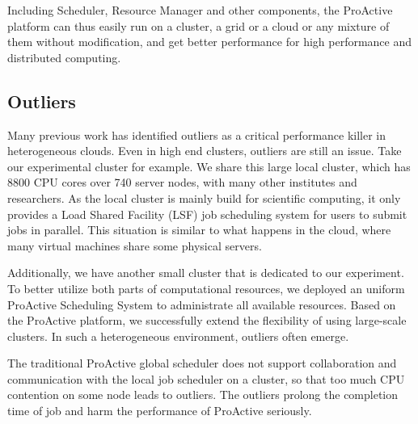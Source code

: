 Including Scheduler, Resource Manager and other components, the ProActive platform can thus easily run on a cluster, a grid or a cloud or any mixture of them without modification, and get better performance for high performance and distributed computing.

\subsection{Outliers}

Many previous work has identified outliers as a critical performance killer in heterogeneous clouds. Even in high end clusters, outliers are still an issue. Take our experimental cluster for example. We share this large local cluster, which has 8800 CPU cores over 740 server nodes, with many other institutes and researchers. As the local cluster is mainly build for scientific computing, it only provides a Load Shared Facility (LSF) job scheduling system for users to submit jobs in parallel. This situation is similar to what happens in the cloud, where many virtual machines share some physical servers.

Additionally, we have another small cluster that is dedicated to our experiment. To better utilize both parts of computational resources, we deployed an uniform ProActive Scheduling System to administrate all available resources. Based on the ProActive platform, we successfully extend the flexibility of using large-scale clusters. In such a heterogeneous environment, outliers often emerge.

The traditional ProActive global scheduler does not support collaboration and communication with the local job scheduler on a cluster, so that too much CPU contention on some node leads to outliers. The outliers prolong the completion time of job and harm the performance of ProActive seriously.
